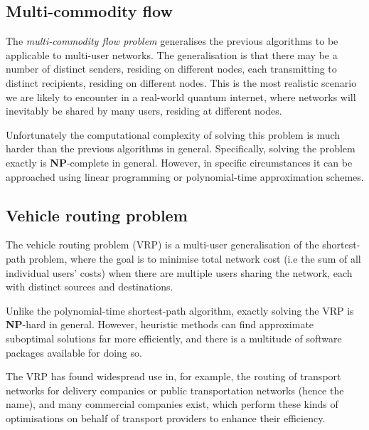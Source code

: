 \documentclass[aps, rmp, twocolumn, amsmath, amssymb, nofootinbib, superscriptaddress, longbibliography, floatfix, table-of-contents, eqsecnum]{revtex4-1}
\begin{document}
%
%

\subsection{Multi-commodity flow} \label{sec:multi_comm_flow} 

The \textit{multi-commodity flow problem} \cite{???} generalises the previous algorithms to be applicable to multi-user networks. The generalisation is that there may be a number of distinct senders, residing on different nodes, each transmitting to distinct recipients, residing on different nodes. This is the most realistic scenario we are likely to encounter in a real-world quantum internet, where networks will inevitably be shared by many users, residing at different nodes.

Unfortunately the computational complexity of solving this problem is much harder than the previous algorithms in general. Specifically, solving the problem exactly is \textbf{NP}-complete in general. However, in specific circumstances it can be approached using linear programming or polynomial-time approximation schemes.

%
%

\subsection{Vehicle routing problem} \label{sec:VRP} 

The vehicle routing problem (VRP) is a multi-user generalisation of the shortest-path problem, where the goal is to minimise total network cost (i.e the sum of all individual users' costs) when there are multiple users sharing the network, each with distinct sources and destinations.

Unlike the polynomial-time shortest-path algorithm, exactly solving the VRP is \textbf{NP}-hard in general. However, heuristic methods can find approximate suboptimal solutions far more efficiently, and there is a multitude of software packages available for doing so.

The VRP has found widespread use in, for example, the routing of transport networks for delivery companies or public transportation networks (hence the name), and many commercial companies exist, which perform these kinds of optimisations on behalf of transport providers to enhance their efficiency.
\end{document}

